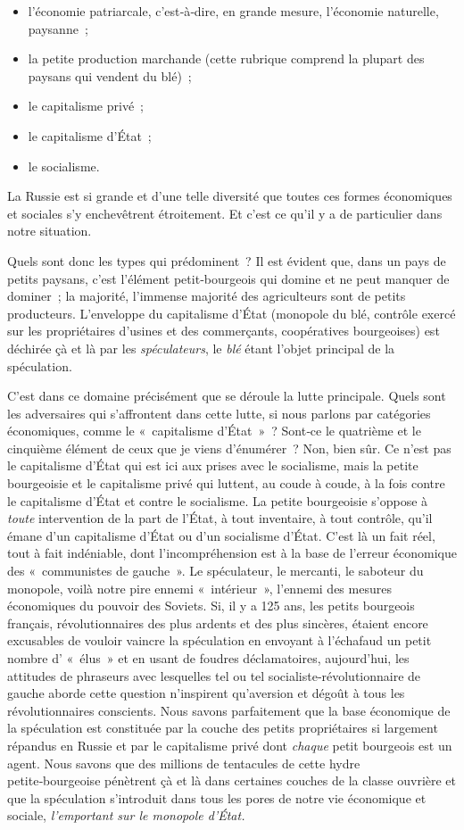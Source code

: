 \documentclass[french,twoside]{book} %
\begin{document}
\begin{itemize}[itemsep=0pt,]
\item l’économie patriarcale, c’est‑à‑dire, en grande mesure, l’économie naturelle, paysanne ;
\item la petite production marchande (cette rubrique comprend la plupart des paysans qui vendent du blé) ;
\item le capitalisme privé ;
\item le capitalisme d’État ;
\item le socialisme.
\end{itemize}
\noindent La Russie est si grande et d’une telle diversité que toutes ces formes économiques et sociales s’y enchevêtrent étroitement. Et c’est ce qu’il y a de particulier dans no­tre situation.\par
Quels sont donc les types qui prédominent ? Il est évident que, dans un pays de petits paysans, c’est l’élément petit‑bourgeois qui domine et ne peut manquer de dominer ; la majorité, l’immense majorité des agriculteurs sont de petits producteurs. L'enveloppe du capitalisme d’État (monopole du blé, contrôle exercé sur les propriétaires d’usines et des commerçants, coopératives bourgeoises) est déchirée çà et là par les \emph{spéculateurs}, le \emph{blé} étant l’objet principal de la spéculation.\par
C'est dans ce domaine précisément que se déroule la lutte principale. Quels sont les adversaires qui s’affrontent dans cette lutte, si nous parlons par catégories économiques, comme le « capitalisme d’État » ? Sont‑ce le quatrième et le cinquième élément de ceux que je viens d’énumérer ? Non, bien sûr. Ce n’est pas le capitalisme d’État qui est ici aux prises avec le socialisme, mais la petite bourgeoisie et le capitalisme privé qui luttent, au coude à coude, à la fois contre le capitalisme d’État et contre le socialisme. La petite bourgeoisie s’oppose à \emph{toute} intervention de la part de l’État, à tout inventaire, à tout contrôle, qu’il émane d’un capitalisme d’État ou d’un socialisme d’État. C’est là un fait réel, tout à fait indéniable, dont l’incompréhension est à la base de l’erreur économique des « communistes de gauche ». Le spéculateur, le mercanti, le saboteur du monopole, voilà notre pire ennemi « intérieur », l’ennemi des mesures économiques du pouvoir des Soviets. Si, il y a 125 ans, les petits bourgeois français, révolutionnaires des plus ardents et des plus sincères, étaient encore excusables de vouloir vaincre la spéculation en envoyant à l’échafaud un petit nombre d’ « élus » et en usant de foudres déclamatoires, aujourd’hui, les attitudes de phraseurs avec lesquelles tel ou tel socialiste‑révolutionnaire de gauche aborde cette question n’inspirent qu’aversion et dégoût à tous les révolutionnaires conscients. Nous savons parfaitement que la base économique de la spéculation est constituée par la couche des petits propriétaires si largement répandus en Russie et par le capitalisme privé dont \emph{chaque} petit bourgeois est un agent. Nous savons que des millions de tentacules de cette hydre petite‑bourgeoise pénètrent çà et là dans certaines couches de la classe ouvrière et que la spéculation s’introduit dans tous les pores de notre vie économique et sociale, \emph{l’emportant sur le monopole d’État.}\par
\end{document}
